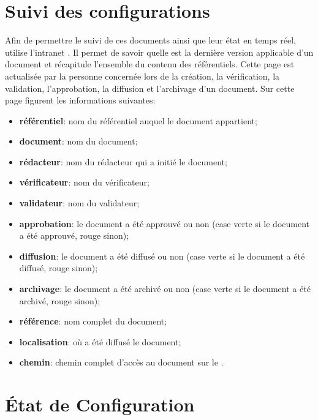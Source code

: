 
\section{Suivi des configurations}

Afin de permettre le suivi de ces documents ainsi que leur état en temps réel, \nomEquipe{} utilise l'intranet \lintranet. 
Il permet de savoir quelle est la dernière version applicable d'un document et récapitule l'ensemble du contenu des référentiels. 
Cette page est actualisée par la personne concernée lors de la création, la vérification, la validation, l'approbation, la diffusion et l'archivage d'un document. Sur cette page figurent les informations suivantes:
\begin{itemize}
	\item \textbf{référentiel}: nom du référentiel auquel le document appartient;
	\item \textbf{document}: nom du document;
	\item \textbf{rédacteur}: nom du rédacteur qui a initié le document;
	\item \textbf{vérificateur}: nom du vérificateur;
	\item \textbf{validateur}: nom du validateur;
	\item \textbf{approbation}: le document a été approuvé ou non (case verte si le document a été
	approuvé, rouge sinon);
	\item \textbf{diffusion}: le document a été diffusé ou non (case verte si le document a été
	diffusé, rouge sinon);
	\item \textbf{archivage}: le document a été archivé ou non (case verte si le document a été
	archivé, rouge sinon);
	\item \textbf{référence}: nom complet du document;
	\item \textbf{localisation}: où a été diffusé le document;
	\item \textbf{chemin}: chemin complet d'accès au document sur le \git.
\end{itemize}


\section{État de Configuration}
\label{EC}

